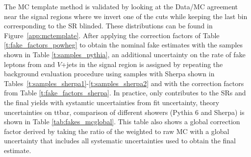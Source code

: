 The MC template method is validated by looking at the Data/MC agreement near the signal regions where we invert one of the cuts while keeping the last bin corresponding to the SR blinded. 
These distributions can be found in Figure~\ref{app:mctemplate}.
After applying the correction factors of Table \ref{t:fake_factors_powheg} to obtain the nominal fake estimates with the samples shown 
in Table \ref{t:samples_pythia}, 
an additional uncertainty on the rate of fake leptons from \ttbar and $V$+jets in the signal region is assigned by repeating the background
 evaluation procedure using samples with Sherpa shown in Tables~\ref{t:samples_sherpa1}-\ref{t:samples_sherpa2} and with the correction 
factors from Table \ref{t:fake_factors_sherpa}. 
In practice, only \ttbar contributes to the SRs and the final yields with systamtic uncertainties from 
fit uncertainty, theory uncertainties on ttbar, comparison of different showers (Pythia 6 and Sherpa) is shown in Table \ref{tab:fakes_mcglobal}.
This table also shows a global correction factor derived by taking the ratio of the weighted \ttbar to raw MC \ttbar with
a global uncertainty that includes all systematic uncertainties used to obtain the final estimate. 

